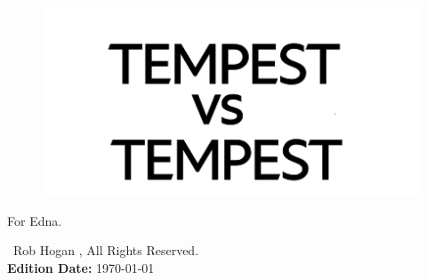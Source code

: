 \blankpage
\vspace*{\fill}
\begin{figure}[H]
    \centering
      \includegraphics[width=12cm]{src/cover/title_page.png}%
\end{figure}
\vspace*{\fill}
\thispagestyle{empty}%
\clearpage

\vspace*{\fill}
For Edna.\\
\bigskip
\vspace*{\fill}

\textcopyright\ Rob Hogan \the\year{}, All Rights Reserved. \\
\textbf{Edition Date:} \today

\doclicenseThis
\thispagestyle{empty}%
\clearpage
